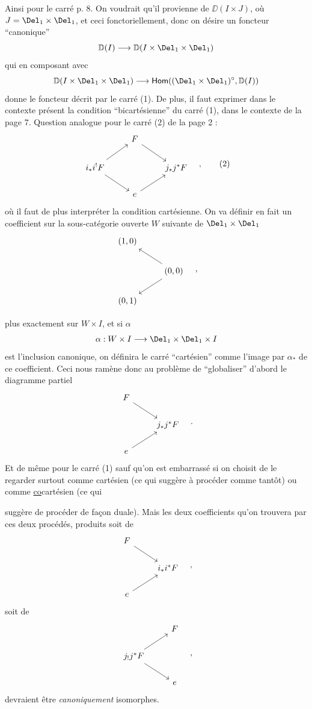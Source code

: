 Ainsi pour le carré p. 8. On voudrait qu'il provienne de $\DD(I \times J)$, où $J = \Del_1 \times \Del_1$, et ceci fonctoriellement, donc on désire un foncteur “canonique”
\[ \DD(I) \longrightarrow \DD(I \times \Del_1 \times \Del_1) \]
qui en composant avec
\[ \DD(I \times \Del_1 \times \Del_1) \longrightarrow \Hom((\Del_1 \times \Del_1)^{\circ}, \DD(I)) \]
donne le foncteur décrit par le carré (1). De plus, il faut exprimer dans le contexte présent la condition “bicartésienne” du carré (1), dans le contexte de la page 7. Question analogue pour le carré (2) de la page 2 :
\[
\begin{tikzcd}
& F \arrow[dr] & \\
i_*i^!F \arrow[ur] \arrow[dr] & & j_*j^*F \\
& e \arrow[ur] &
\end{tikzcd}
\quad ,
\tag*{(2)}
\]
où il faut de plus interpréter la condition cartésienne. On va définir en fait un coefficient sur la sous-catégorie ouverte $W$ suivante de $\Del_1 \times \Del_1$
\[
\begin{tikzcd}
(1,0) & \\
& (0,0) \arrow[ul] \arrow[dl] \\
(0,1) &
\end{tikzcd}
\quad ,
\]


plus exactement sur $W \times I$, et si $\alpha$
\[ \alpha : W \times I \longrightarrow \Del_1 \times \Del_1 \times I \]
est l'inclusion canonique, on définira le carré “cartésien” comme l'image par $\alpha_*$ de ce coefficient. Ceci nous ramène donc au problème de “globaliser” d'abord le diagramme partiel
\[
\begin{tikzcd}
F \arrow[dr] & \\
& j_*j^*F \\
e \arrow[ur] &
\end{tikzcd}
\quad .
\]
Et de même pour le carré (1) sauf qu'on est embarrassé si on choisit de le regarder surtout comme cartésien (ce qui suggère à procéder comme tantôt) ou comme \underline{co}cartésien (ce qui %

\noindent suggère de procéder de façon duale). Mais les deux coefficients qu’on trouvera par ces deux procédés, produits soit de
\[
\begin{tikzcd}
F \arrow[dr] & \\
 & i_*i^*F \\
e \arrow[ur] &
\end{tikzcd}
\quad ,
\]
soit de
\[
\begin{tikzcd}
 & F \\
j_!j^*F \arrow[ur] \arrow[dr] & \\
 & e
\end{tikzcd}
\quad ,
\]
devraient être \textit{canoniquement} isomorphes.

